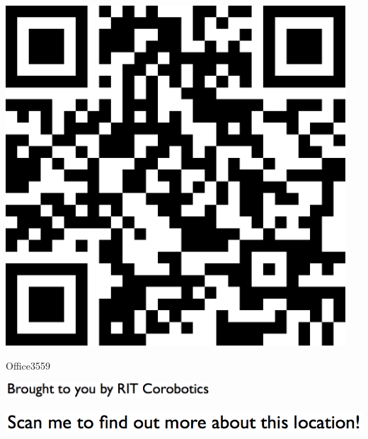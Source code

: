 \documentclass[letterpaper]{article}
\begin{document}
 \begingroup 
 \centerline{\includegraphics[scale=1,width=5in,height=5in]{Office3559.png}} 
 \endgroup 
 \vspace*{\fill} 

 \hfill{\small Office3559} 

  \vspace{0.7in} 
 
 \centerline{\includegraphics[scale=1,width=3in]{text-bottom.png}} 
 
 \pagebreak 
{} 
 \vspace*{\fill} 
 
  \centerline{\includegraphics[scale=1,width=6in]{text-top.png}} 
 
 \vspace{0.5in} 
 
\end{document}

